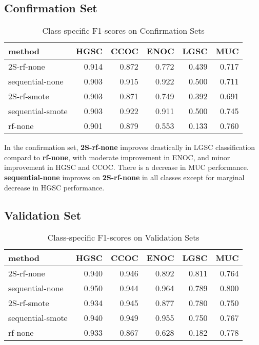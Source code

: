 \documentclass[
]{report}
\begin{document}
\hypertarget{confirmation-set}{%
\subsection{Confirmation Set}\label{confirmation-set}}

\begin{table}

\caption{\label{tab:confirmation-set}Class-specific F1-scores on Confirmation Sets}
\centering
\begin{tabular}[t]{l|r|r|r|r|r}
\hline
method & HGSC & CCOC & ENOC & LGSC & MUC\\
\hline
2S-rf-none & 0.914 & 0.872 & 0.772 & 0.439 & 0.717\\
\hline
sequential-none & 0.903 & 0.915 & 0.922 & 0.500 & 0.711\\
\hline
2S-rf-smote & 0.903 & 0.871 & 0.749 & 0.392 & 0.691\\
\hline
sequential-smote & 0.903 & 0.922 & 0.911 & 0.500 & 0.745\\
\hline
rf-none & 0.901 & 0.879 & 0.553 & 0.133 & 0.760\\
\hline
\end{tabular}
\end{table}

In the confirmation set, \textbf{2S-rf-none} improves drastically in LGSC classification compard to \textbf{rf-none}, with moderate improvement in ENOC, and minor improvement in HGSC and CCOC. There is a decrease in MUC performance. \textbf{sequential-none} improves on \textbf{2S-rf-none} in all classes except for marginal decrease in HGSC performance.

\hypertarget{validation-set}{%
\subsection{Validation Set}\label{validation-set}}

\begin{table}

\caption{\label{tab:validation-set}Class-specific F1-scores on Validation Sets}
\centering
\begin{tabular}[t]{l|r|r|r|r|r}
\hline
method & HGSC & CCOC & ENOC & LGSC & MUC\\
\hline
2S-rf-none & 0.940 & 0.946 & 0.892 & 0.811 & 0.764\\
\hline
sequential-none & 0.950 & 0.944 & 0.964 & 0.789 & 0.800\\
\hline
2S-rf-smote & 0.934 & 0.945 & 0.877 & 0.780 & 0.750\\
\hline
sequential-smote & 0.940 & 0.949 & 0.955 & 0.750 & 0.767\\
\hline
rf-none & 0.933 & 0.867 & 0.628 & 0.182 & 0.778\\
\hline
\end{tabular}
\end{table}
\end{document}
